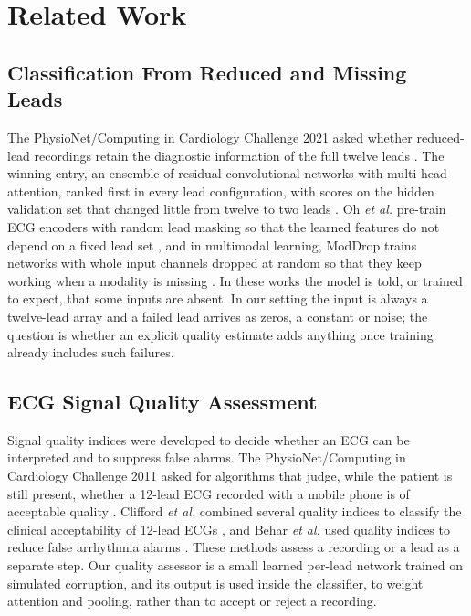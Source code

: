 \section{Related Work}
\label{sec:related}

\subsection{Classification From Reduced and Missing Leads}
The PhysioNet/Computing in Cardiology Challenge 2021 asked whether reduced-lead recordings retain the diagnostic
information of the full twelve leads \cite{reyna2021willtwodo}. The winning entry, an ensemble of residual
convolutional networks with multi-head attention, ranked first in every lead configuration, with scores on the
hidden validation set that changed little from twelve to two leads \cite{nejedly2021cinc,nejedly2022ensemble}. Oh
\emph{et al.} pre-train ECG encoders with random lead masking so that the learned features do not depend on a fixed
lead set \cite{oh2022leadagnostic}, and in multimodal learning, ModDrop trains networks with whole input channels
dropped at random so that they keep working when a modality is missing \cite{neverova2016moddrop}. In these works
the model is told, or trained to expect, that some inputs are absent. In our setting the input is always a
twelve-lead array and a failed lead arrives as zeros, a constant or noise; the question is whether an explicit
quality estimate adds anything once training already includes such failures.

\subsection{ECG Signal Quality Assessment}
Signal quality indices were developed to decide whether an ECG can be interpreted and to suppress false alarms.
The PhysioNet/Computing in Cardiology Challenge 2011 asked for algorithms that judge, while the patient is still
present, whether a 12-lead ECG recorded with a mobile phone is of acceptable quality \cite{silva2011challenge}.
Clifford \emph{et al.} combined several quality indices to classify the clinical acceptability of 12-lead ECGs
\cite{clifford2012sqi}, and Behar \emph{et al.} used quality indices to reduce false arrhythmia alarms
\cite{behar2013sqi}. These methods assess a recording or a lead as a separate step. Our quality assessor is a small
learned per-lead network trained on simulated corruption, and its output is used inside the classifier, to weight
attention and pooling, rather than to accept or reject a recording.

